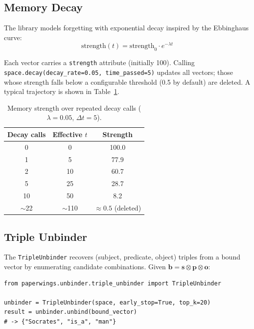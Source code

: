 \documentclass[11pt]{article}
\begin{document}
\subsection{Memory Decay}

The library models forgetting with exponential decay inspired by the Ebbinghaus curve:
\begin{equation}
    \text{strength}(t) = \text{strength}_0 \cdot e^{-\lambda t}
    \label{eq:decay}
\end{equation}

\noindent Each vector carries a \texttt{strength} attribute (initially 100). Calling \texttt{space.decay(decay\_rate=0.05, time\_passed=5)} updates all vectors; those whose strength falls below a configurable threshold (0.5 by default) are deleted. A typical trajectory is shown in Table~\ref{tab:decay}.

\begin{table}[h]
\centering
\caption{Memory strength over repeated decay calls ($\lambda = 0.05$, $\Delta t = 5$).}
\label{tab:decay}
\begin{tabular}{@{}ccc@{}}
\toprule
\textbf{Decay calls} & \textbf{Effective $t$} & \textbf{Strength} \\
\midrule
0  & 0   & 100.0 \\
1  & 5   & 77.9 \\
2  & 10  & 60.7 \\
5  & 25  & 28.7 \\
10 & 50  & 8.2 \\
$\sim$22 & $\sim$110 & $\approx 0.5$ (deleted) \\
\bottomrule
\end{tabular}
\end{table}

\subsection{Triple Unbinder}

The \texttt{TripleUnbinder} recovers (subject, predicate, object) triples from a bound vector by enumerating candidate combinations. Given $\mathbf{b} = \mathbf{s} \otimes \mathbf{p} \otimes \mathbf{o}$:

\begin{lstlisting}
from paperwings.unbinder.triple_unbinder import TripleUnbinder

unbinder = TripleUnbinder(space, early_stop=True, top_k=20)
result = unbinder.unbind(bound_vector)
# -> {"Socrates", "is_a", "man"}
\end{lstlisting}
\end{document}
